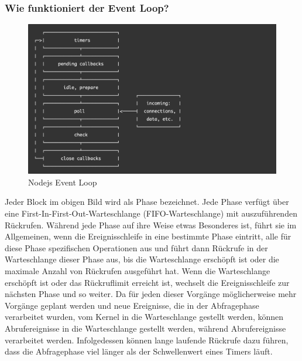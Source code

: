 \subsubsection{Wie funktioniert der Event Loop?}

\begin{figure}[H]
    \begin{center}
        \includegraphics[scale=0.5]{images/nodejs_event_loop.png}
        \caption{Nodejs Event Loop \cite{nodejs_event_loop}}
    \end{center}
\end{figure}

Jeder Block im obigen Bild wird als Phase bezeichnet.
Jede Phase verfügt über eine First-In-First-Out-Warteschlange (FIFO-Warteschlange) mit auszuführenden Rückrufen. 
Während jede Phase auf ihre Weise etwas Besonderes ist, führt sie im Allgemeinen,
wenn die Ereignisschleife in eine bestimmte Phase eintritt, alle für diese Phase spezifischen Operationen aus und führt dann Rückrufe in der Warteschlange dieser Phase aus, 
bis die Warteschlange erschöpft ist oder die maximale Anzahl von Rückrufen ausgeführt hat. 
Wenn die Warteschlange erschöpft ist oder das Rückruflimit erreicht ist, wechselt die Ereignisschleife zur nächsten Phase und so weiter.
\newline
\newline
Da für jeden dieser Vorgänge möglicherweise mehr Vorgänge geplant werden und neue Ereignisse, 
die in der Abfragephase verarbeitet wurden, vom Kernel in die Warteschlange gestellt werden, 
können Abrufereignisse in die Warteschlange gestellt werden, während Abrufereignisse verarbeitet werden. 
Infolgedessen können lange laufende Rückrufe dazu führen, dass die Abfragephase viel länger als der Schwellenwert eines Timers läuft. 

